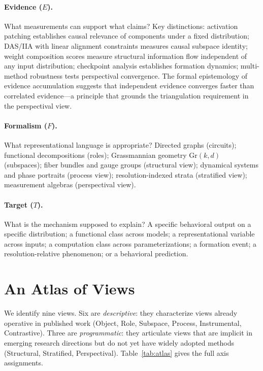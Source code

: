 \documentclass{article}
\newcommand{\Gr}{\mathrm{Gr}}
\begin{document}
\paragraph{Evidence ($E$).}
What measurements can support what claims?  Key distinctions: activation
patching establishes causal relevance of components under a fixed
distribution; DAS/IIA with linear alignment constraints measures causal
subspace identity; weight composition scores measure structural
information flow independent of any input distribution; checkpoint
analysis establishes formation dynamics; multi-method robustness tests
perspectival convergence.  The formal epistemology of evidence
accumulation \citep{earman1992,howson1989} suggests that independent
evidence converges faster than correlated evidence---a principle that
grounds the triangulation requirement in the perspectival view.

\paragraph{Formalism ($F$).}
What representational language is appropriate?  Directed graphs (circuits);
functional decompositions (roles); Grassmannian geometry $\Gr(k,d)$
(subspaces); fiber bundles and gauge groups (structural view); dynamical
systems and phase portraits (process view); resolution-indexed strata
(stratified view); measurement algebras (perspectival view).

\paragraph{Target ($T$).}
What is the mechanism supposed to explain?  A specific behavioral output
on a specific distribution; a functional class across models; a
representational variable across inputs; a computation class across
parameterizations; a formation event; a resolution-relative phenomenon;
or a behavioral prediction.

\section{An Atlas of Views}\label{sec:atlas}

We identify nine views.  Six are \emph{descriptive}: they characterize
views already operative in published work (Object, Role, Subspace,
Process, Instrumental, Contrastive).  Three are \emph{programmatic}:
they articulate views that are implicit in emerging research directions
but do not yet have widely adopted methods (Structural, Stratified,
Perspectival).
Table~\ref{tab:atlas} gives the full axis assignments.
\end{document}
